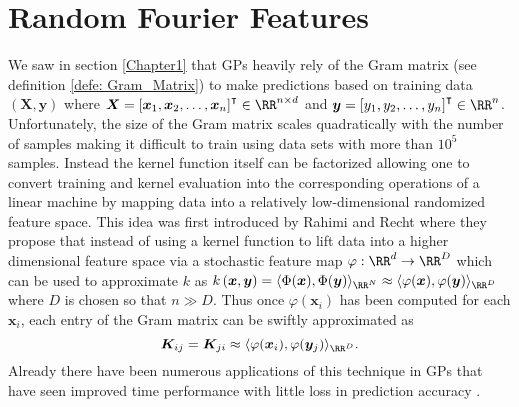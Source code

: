 \section{Random Fourier Features}\label{Chapter3}
We saw in section \ref{Chapter1} that GPs heavily rely of the Gram matrix (see definition \ref{defe: Gram_Matrix}) to make predictions based on training data $\left( \bm{X} , \bm{y} \right)$ where $\bm{X} = \left[ \bm{x}_1 , \bm{x}_2 , \ldots , \bm{x}_n \right]^{\intercal} \in \RR^{n \times d}$ and $\bm{y} = \left[ y_1 , y_2 , \ldots , y_n \right]^{\intercal} \in \RR^{n}$. Unfortunately, the size of the Gram matrix scales quadratically with the number of samples making it difficult to train using data sets with more than $10^5$ samples. Instead the kernel function itself can be factorized allowing one to convert training and kernel evaluation into the corresponding operations of a linear machine by mapping data into a relatively low-dimensional randomized feature space. This idea was first introduced by Rahimi and Recht \cite{NIPS2007_013a006f} where they propose that instead of using a kernel function to lift data into a higher dimensional feature space via a stochastic feature map $\varphi : \RR^d \to \RR^D$ which can be used to approximate $k$ as $k \left( \bm{x} , \bm{y} \right) = \langle \Phi (\bm{x}) , \Phi (\bm{y}) \rangle_{\RR^N} \approx \langle \varphi (\bm{x}) , \varphi (\bm{y}) \rangle_{\RR^D}$ where $D$ is chosen so that $n \gg  D$. Thus once $\varphi (\bm{x}_i)$ has been computed for each $\bm{x}_i$, each entry of the Gram matrix can be swiftly approximated as
\[
    \bm{K}_{ij} = \bm{K}_{ji} \approx \langle \varphi (\bm{x}_i) , \varphi (\bm{y}_j) \rangle_{\RR^D}.
\]
Already there have been numerous applications of this technique in GPs that have seen improved time performance with little loss in prediction accuracy \cite{PotapczynskiAndres2021BSGP}.





